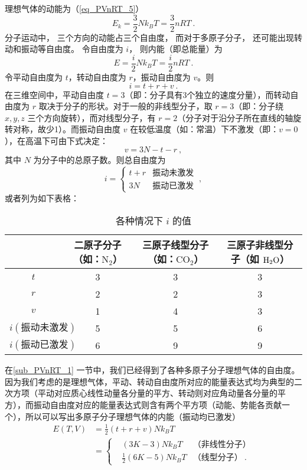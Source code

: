 


理想气体的动能为（\autoref{eq_PVnRT_5}）
\begin{equation}
E_k = \frac32 Nk_B T = \frac{3}{2}nRT~.
\end{equation}
分子运动中， 三个方向的动能占三个自由度， 而对于多原子分子， 还可能出现转动和振动等自由度。 令自由度为 $i$， 则内能（即总能量）为
\begin{equation}\label{eq_IdgEng_1}
E = \frac{i}{2}Nk_B T = \frac{i}{2}nRT~.
\end{equation}
令平动自由度为 $t$，转动自由度为 $r$，振动自由度为 $v$。则
\begin{equation}
i=t+r+v~.
\end{equation}
在三维空间中，平动自由度 $t=3$（即：分子具有3个独立的速度分量），而转动自由度为 $r$ 取决于分子的形状。对于一般的非线型分子，取 $r=3$（即：分子绕 $x,y,z$ 三个方向旋转），而对线型分子，有 $r=2$（分子对于沿分子所在直线的轴旋转对称，故少1）。而振动自由度 $v$ 在较低温度（如：常温）下不激发（即：$v=0$），在高温下可由下式决定：
\begin{equation}
v=3N-t-r~,
\end{equation}
其中 $N$ 为分子中的总原子数。则总自由度为
\begin{equation}
i=\left\{\begin{matrix}{t+r}&{\text{振动未激发}}\\{3N}&{\text{振动已激发}}\end{matrix}\right.~,
\end{equation}
或者列为如下表格：\begin{table}[ht]
\centering
\caption{各种情况下 $i$ 的值}\label{tab_IdgEng_1}
\begin{tabular}{|c|c|c|c|}
\hline
 & 二原子分子（如：$\text{N}_2$） & 三原子线型分子（如：$\text{CO}_2$） & 三原子非线型分子（如 $\text H_2\text O$） \\
\hline
$t$ & 3 & 3 & 3 \\
\hline
$r$ & 2 & 2 & 3 \\
\hline
$v$ & 1 & 4 & 3 \\
\hline
$i(\text{振动未激发})$ & 5 & 5 & 6 \\
\hline
$i(\text{振动已激发})$ & 6 & 9 & 9 \\
\hline
\end{tabular}
\end{table}
在\autoref{sub_PVnRT_1} 一节中，我们已经得到了各种多原子分子理想气体的自由度。因为我们考虑的是理想气体，平动、转动自由度所对应的能量表达式均为典型的二次方项（平动对应质心线性动量各分量的平方、转动则对应角动量各分量的平方），而振动自由度对应的能量表达式则含有两个平方项（动能、势能各贡献一个），所以可以写出多原子分子理想气体的内能（振动均已激发）
\begin{equation}
\begin{aligned}
E(T, V) &= \frac 12 (t+r+v)Nk_B T \\
&= \left\{\begin{aligned}
&(3K-3)Nk_BT &\text{（非线性分子）}\\
&\frac12(6K-5)Nk_BT&\text{（线型分子）} ~.
\end{aligned}\right.
\end{aligned}
\end{equation}

